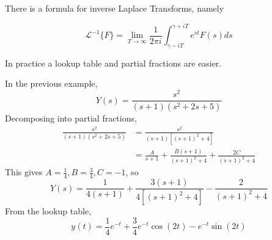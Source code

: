 \documentclass[12pt]{article}
\begin{document}
There is a formula for inverse Laplace Transforms, namely

$$\mathcal{L}^{-1}\{F\} = \lim_{T \rightarrow \infty} \frac{1}{2\pi i} \int_{\gamma-iT}^{\gamma+iT} e^{st}F(s)ds$$

In practice a lookup table and partial fractions are easier.

\begin{ex}
	In the previous example,
	$$Y(s) = \frac{s^2}{(s+1)(s^2+2s+5)}$$
	Decomposing into partial fractions,
	\begin{align*}
		\frac{s^2}{(s+1)(s^2+2s+5)} &= \frac{s^2}{(s+1)[(s+1)^2+4]} \\
					    &= \frac{A}{s+1} + \frac{B(s+1)}{(s+1)^2+4} + \frac{2C}{(s+1)^2+4}
	\end{align*}
	This gives $A = \frac{1}{4}, B = \frac{3}{4}, C = -1$, so
	$$Y(s) = \frac{1}{4(s+1)} + \frac{3(s+1)}{4[(s+1)^2+4]} - \frac{2}{(s+1)^2+4}$$
	From the lookup table,
	$$y(t) = \frac{1}{4}e^{-t} + \frac{3}{4}e^{-t}\cos(2t) - e^{-t}\sin(2t)$$
\end{ex}
\end{document}
